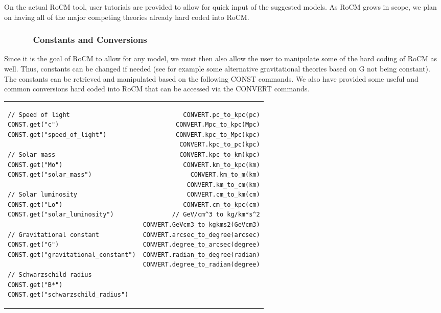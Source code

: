 \documentclass[conference]{IEEEtran-modified}
\begin{document}
On the actual RoCM tool, user tutorials are provided to allow for quick input of the suggested models.  As RoCM grows in scope, we plan on having all of the major competing theories already hard coded into RoCM.


\subsubsection{\ \ \ \ \ \ Constants and Conversions}
Since it is the goal of RoCM to allow for any model, we must then also allow the user to manipulate some of the hard coding of RoCM as well.  Thus, constants can be changed if needed (see for example some alternative gravitational theories based on G not being constant). The constants can be retrieved and manipulated based on the following CONST commands. We also have provided some useful and common conversions hard coded into RoCM that can be accessed via the CONVERT commands.\begin{center}
\begin{tabular}{l !{\color{lightgray}\vrule} r}
\begin{lstlisting}
// Speed of light
CONST.get("c")
CONST.get("speed_of_light")

// Solar mass
CONST.get("Mo")
CONST.get("solar_mass")

// Solar luminosity
CONST.get("Lo")
CONST.get("solar_luminosity")

// Gravitational constant
CONST.get("G")
CONST.get("gravitational_constant")

// Schwarzschild radius
CONST.get("B*")
CONST.get("schwarzschild_radius")
\end{lstlisting}
&
\begin{lstlisting}
CONVERT.pc_to_kpc(pc)
CONVERT.Mpc_to_kpc(Mpc)
CONVERT.kpc_to_Mpc(kpc)
CONVERT.kpc_to_pc(kpc)
CONVERT.kpc_to_km(kpc)
CONVERT.km_to_kpc(km)
CONVERT.km_to_m(km)
CONVERT.km_to_cm(km)
CONVERT.cm_to_km(cm)
CONVERT.cm_to_kpc(cm)
// GeV/cm^3 to kg/km*s^2
CONVERT.GeVcm3_to_kgkms2(GeVcm3)
CONVERT.arcsec_to_degree(arcsec)
CONVERT.degree_to_arcsec(degree)
CONVERT.radian_to_degree(radian)
CONVERT.degree_to_radian(degree)
\end{lstlisting}
\end{tabular}
\end{center}

\end{document}
